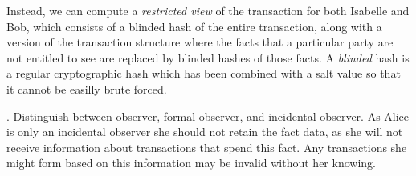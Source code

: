 Instead, we can compute a \emph{restricted view} of the transaction for both Isabelle and Bob, which consists of a blinded hash of the entire transaction, along with a version of the transaction structure where the facts that a particular party are not entitled to see are replaced by blinded hashes of those facts. A \emph{blinded} hash is a regular cryptographic hash which has been combined with a salt value so that it cannot be easilly brute forced.

. Distinguish between observer, formal observer, and incidental observer. As Alice is only an incidental observer she should not retain the fact data, as she will not receive information about transactions that spend this fact. Any transactions she might form based on this information may be invalid without her knowing.











